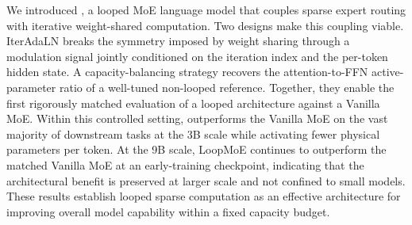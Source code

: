 
We introduced \ourmodelnospace, a looped MoE language model that couples sparse expert routing with iterative weight-shared computation. Two designs make this coupling viable. IterAdaLN breaks the symmetry imposed by weight sharing through a modulation signal jointly conditioned on the iteration index and the per-token hidden state. A capacity-balancing strategy recovers the attention-to-FFN active-parameter ratio of a well-tuned non-looped reference. Together, they enable the first rigorously matched evaluation of a looped architecture against a Vanilla MoE. Within this controlled setting, \ourmodel outperforms the Vanilla MoE on the vast majority of downstream tasks at the 3B scale while activating fewer physical parameters per token. At the 9B scale, LoopMoE continues to outperform the matched Vanilla MoE at an early-training checkpoint, indicating that the architectural benefit is preserved at larger scale and not confined to small models. These results establish looped sparse computation as an effective architecture for improving overall model capability within a fixed capacity budget.

